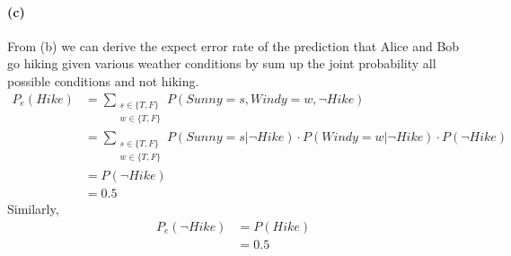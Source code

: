 \documentclass[a4paper]{article}
\begin{document}
\paragraph{(c)} From (b) we can derive the expect error rate of the prediction that Alice and Bob go hiking given various weather conditions by sum up the joint probability all possible conditions and not hiking.
	\begin{align}
		P_e(Hike) &= \sum_{\substack{
			s \in \{T, F\}\\
			w \in \{T, F\}}} P(Sunny=s, Windy=w, \neg Hike) \\
			&= \sum_{\substack{
			s \in \{T, F\}\\
			w \in \{T, F\}}} P(Sunny=s|\neg Hike) \cdot P(Windy=w|\neg Hike) \cdot P(\neg Hike)\\
			&= P(\neg Hike) \\
			&= 0.5
	\end{align}
	Similarly,
	\begin{align}
		P_e(\neg Hike) &= P(Hike) \\
			&= 0.5
	\end{align}
\end{document}
